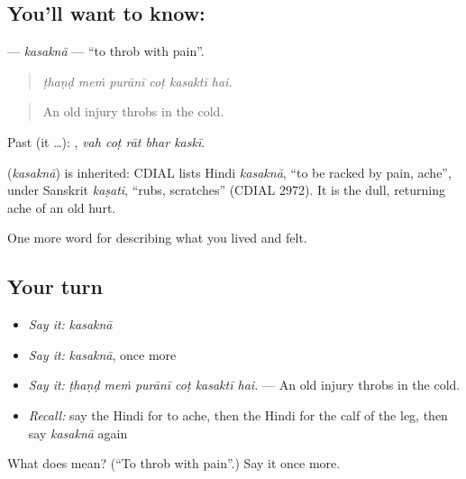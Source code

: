 \subsection*{You'll want to know: }
\textbf{} — \emph{kasaknā} — \textquotedblleft{}to throb with pain\textquotedblright{}.

\begin{quote}
     
\end{quote}

\begin{quote}
\emph{ṭhaṇḍ meṁ purānī coṭ kasaktī hai.}
\end{quote}

\begin{quote}
An old injury throbs in the cold.
\end{quote}

Past (it …):     , \emph{vah coṭ rāt bhar kaskī}.

\begin{cousinweb}
\textbf{} (\emph{kasaknā}) is inherited: CDIAL lists Hindi \emph{kasaknā}, \textquotedblleft{}to be racked by pain, ache\textquotedblright{}, under Sanskrit \emph{kaṣati}, \textquotedblleft{}rubs, scratches\textquotedblright{} (CDIAL 2972). It is the dull, returning ache of an old hurt.
\end{cousinweb}

\begin{grammarlens}[title={What you've built}]
One more word for describing what you lived and felt.
\end{grammarlens}

\subsection*{Your turn}
\begin{itemize}
\raggedright
  \item \emph{Say it:} \emph{kasaknā}
  \item \emph{Say it:} \emph{kasaknā}, once more
  \item \emph{Say it:} \emph{ṭhaṇḍ meṁ purānī coṭ kasaktī hai.} — An old injury throbs in the cold.
  \item \emph{Recall:} say the Hindi for to ache, then the Hindi for the calf of the leg, then say \emph{kasaknā} again
\end{itemize}

\begin{tcolorbox}[breakable,colback=teal!4,colframe=teal!35!black,title={Before you move on}]
What does  mean? (\textquotedblleft{}To throb with pain\textquotedblright{}.) Say it once more.
\end{tcolorbox}
